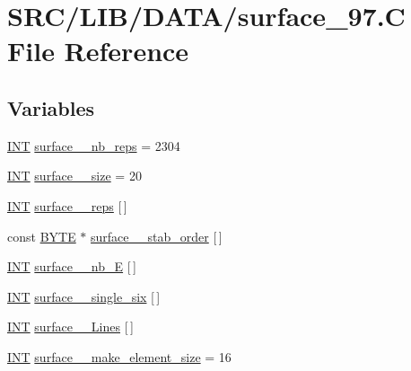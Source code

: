 \hypertarget{surface__97_8_c}{}\section{S\+R\+C/\+L\+I\+B/\+D\+A\+T\+A/surface\+\_\+97.C File Reference}
\label{surface__97_8_c}
\subsection*{Variables}
\begin{DoxyCompactItemize}
\item 
\mbox{\hyperlink{galois_8h_a09fddde158a3a20bd2dcadb609de11dc}{I\+NT}} \mbox{\hyperlink{surface__97_8_c_a90c16d0e327d8ee1fd5c2699fc25d3db}{surface\+\_\+\_\+nb\+\_\+reps}} = 2304
\item 
\mbox{\hyperlink{galois_8h_a09fddde158a3a20bd2dcadb609de11dc}{I\+NT}} \mbox{\hyperlink{surface__97_8_c_a2bdf0a51ff898068677535385a11154c}{surface\+\_\+\_\+size}} = 20
\item 
\mbox{\hyperlink{galois_8h_a09fddde158a3a20bd2dcadb609de11dc}{I\+NT}} \mbox{\hyperlink{surface__97_8_c_a4be739f0fe35eff3d6f29c9b49593b39}{surface\+\_\+\_\+reps}} \mbox{[}$\,$\mbox{]}
\item 
const \mbox{\hyperlink{galois_8h_ab6cc7b4aeb6ea31aba2b3fbfc83ff5e6}{B\+Y\+TE}} $\ast$ \mbox{\hyperlink{surface__97_8_c_a7f9579828929895f44a504c0977bdd24}{surface\+\_\+\_\+stab\+\_\+order}} \mbox{[}$\,$\mbox{]}
\item 
\mbox{\hyperlink{galois_8h_a09fddde158a3a20bd2dcadb609de11dc}{I\+NT}} \mbox{\hyperlink{surface__97_8_c_a437482dbf4fb67020ceceb246f0fa43c}{surface\+\_\+\_\+nb\+\_\+E}} \mbox{[}$\,$\mbox{]}
\item 
\mbox{\hyperlink{galois_8h_a09fddde158a3a20bd2dcadb609de11dc}{I\+NT}} \mbox{\hyperlink{surface__97_8_c_a2a0907f73cf9e4b419a355fed15a871e}{surface\+\_\+\_\+single\+\_\+six}} \mbox{[}$\,$\mbox{]}
\item 
\mbox{\hyperlink{galois_8h_a09fddde158a3a20bd2dcadb609de11dc}{I\+NT}} \mbox{\hyperlink{surface__97_8_c_ae983b9b1cada9bb51af0f5c15e3b6697}{surface\+\_\+\_\+\+Lines}} \mbox{[}$\,$\mbox{]}
\item 
\mbox{\hyperlink{galois_8h_a09fddde158a3a20bd2dcadb609de11dc}{I\+NT}} \mbox{\hyperlink{surface__97_8_c_ac8a59cb8ce1b421d5237a6647ee14eee}{surface\+\_\+\_\+make\+\_\+element\+\_\+size}} = 16
\item 

\end{DoxyCompactItemize}
